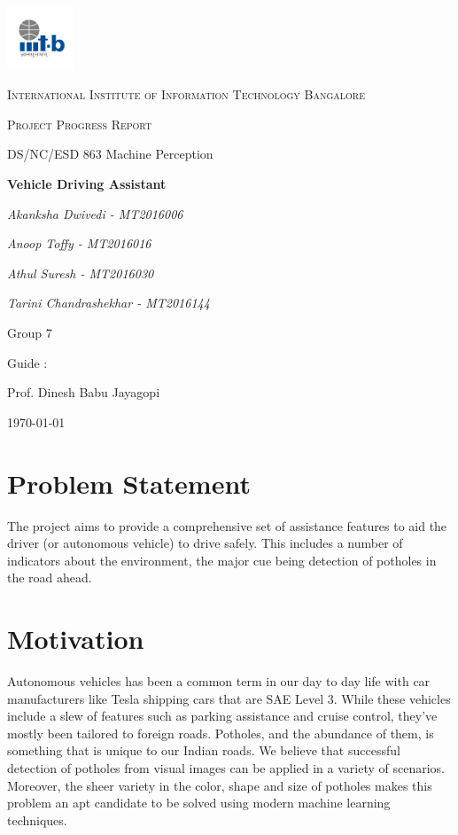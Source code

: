 \documentclass[12pt,a4paper]{article}
\begin{document}
\begin{titlepage}
	\centering
	\includegraphics[width=0.15\textwidth]{IIIT-B_logo.jpg}\par\vspace{1cm}
	{\scshape\LARGE International Institute of Information Technology Bangalore \par}
	\vspace{1cm}
	{\scshape\Large Project Progress Report\par}
	{\Large DS/NC/ESD 863 Machine Perception\par}
	\vspace{1.5cm}
	{\huge\bfseries Vehicle Driving Assistant \par}
	\vspace{2cm}	   
	{\Large\itshape Akanksha Dwivedi - MT2016006\par}
	{\Large\itshape Anoop Toffy - MT2016016\par}
	{\Large\itshape Athul Suresh - MT2016030\par}
	{\Large\itshape Tarini Chandrashekhar - MT2016144\par}
	\vfill
	{\huge Group 7 \par}
	\vfill
	Guide : \par
	Prof. Dinesh Babu Jayagopi 

	\vfill

	{\large \today\par}
\end{titlepage}


\tableofcontents
\newpage

\section{Problem Statement}
The project aims to provide a comprehensive set of assistance features to aid the driver (or autonomous vehicle) to drive safely. This includes a number of indicators about the environment, the major cue being detection of potholes in the road ahead.


\section{Motivation}
Autonomous vehicles has been a common term in our day to day life with car manufacturers like Tesla shipping cars that are SAE Level 3. While these vehicles include a slew of features such as parking assistance and cruise control, they've mostly been tailored to foreign roads. Potholes, and the abundance of them, is something that is unique to our Indian roads. We believe that successful detection of potholes from visual images can be applied in a variety of scenarios.
Moreover, the sheer variety in the color, shape and size of potholes makes this problem an apt candidate to be solved using modern machine learning techniques. 
\end{document}
